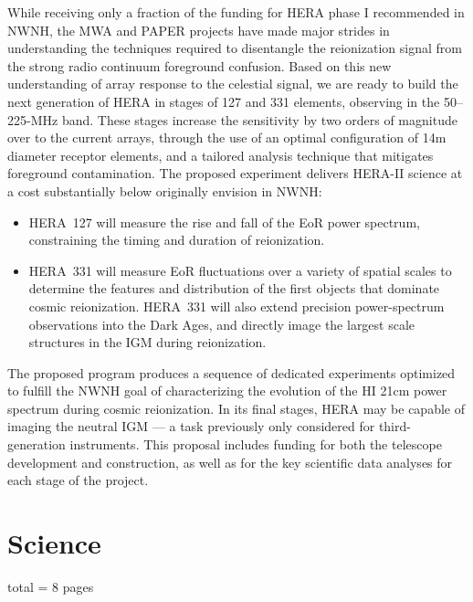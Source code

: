 \documentclass[preprint]{aastex}
\begin{document}
While receiving only a fraction of the funding for HERA phase I
recommended in NWNH, the MWA and PAPER projects have made
major strides in understanding the techniques required to disentangle
the reionization signal from the strong radio continuum foreground
confusion. Based on this new understanding of array response to the
celestial signal, we are ready to build the next generation of HERA in
stages of 127 and 331 elements, observing in the 50--225-MHz band.
These stages increase the sensitivity by two orders of
magnitude over to the current arrays, through the use of an
optimal configuration of 14m diameter receptor elements, and a
tailored analysis technique that mitigates foreground contamination.
The proposed experiment delivers HERA-II science at a cost
substantially below originally envision in NWNH:


\vspace{-4pt}
\begin{itemize}\setlength{\parskip}{0pt}\itemsep0pt

\item HERA~127 will measure the rise and fall of the EoR power
spectrum, constraining the timing and duration of reionization.

\item HERA~331 will measure EoR fluctuations over a variety of spatial
scales to determine the features and distribution of the first objects
that dominate cosmic reionization. HERA~331 will also extend precision
power-spectrum observations into the Dark Ages, and directly image the
largest scale structures in the IGM during reionization.

\end{itemize}
\vspace{-4pt}

The proposed program produces a sequence of dedicated experiments
optimized to fulfill the NWNH goal of characterizing the evolution of
the HI 21cm power spectrum during cosmic reionization. In
its final stages, HERA may be capable of imaging the neutral
IGM --- a task previously only considered for third-generation
instruments. This proposal includes funding for both the
telescope development and construction, as well as for the key
scientific data analyses for each stage of the project.

\section{Science} total = 8 pages
\end{document}
